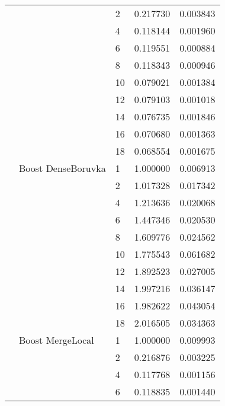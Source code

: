 \begin{tabular}{lllrr}
                      &                     & 2  &  0.217730 &  0.003843 \\
                      &                     & 4  &  0.118144 &  0.001960 \\
                      &                     & 6  &  0.119551 &  0.000884 \\
                      &                     & 8  &  0.118343 &  0.000946 \\
                      &                     & 10 &  0.079021 &  0.001384 \\
                      &                     & 12 &  0.079103 &  0.001018 \\
                      &                     & 14 &  0.076735 &  0.001846 \\
                      &                     & 16 &  0.070680 &  0.001363 \\
                      &                     & 18 &  0.068554 &  0.001675 \\
                      & Boost DenseBoruvka & 1  &  1.000000 &  0.006913 \\
                      &                     & 2  &  1.017328 &  0.017342 \\
                      &                     & 4  &  1.213636 &  0.020068 \\
                      &                     & 6  &  1.447346 &  0.020530 \\
                      &                     & 8  &  1.609776 &  0.024562 \\
                      &                     & 10 &  1.775543 &  0.061682 \\
                      &                     & 12 &  1.892523 &  0.027005 \\
                      &                     & 14 &  1.997216 &  0.036147 \\
                      &                     & 16 &  1.982622 &  0.043054 \\
                      &                     & 18 &  2.016505 &  0.034363 \\
                      & Boost MergeLocal & 1  &  1.000000 &  0.009993 \\
                      &                     & 2  &  0.216876 &  0.003225 \\
                      &                     & 4  &  0.117768 &  0.001156 \\
                      &                     & 6  &  0.118835 &  0.001440 \\

\end{tabular}
